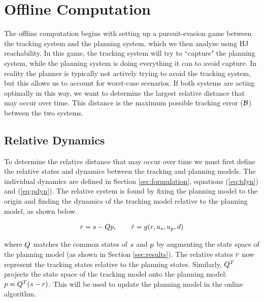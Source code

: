 \section{Offline Computation \label{sec:precomp}}
The offline computation begins with setting up a pursuit-evasion game \cite{Huang11, Chen17} between the tracking system and the planning system, which we then analyze using HJ reachability. In this game, the tracking system will try to ``capture" the planning system, while the planning system is doing everything it can to avoid capture. In reality the planner is typically not actively trying to avoid the tracking system, but this allows us to account for worst-case scenarios. If both systems are acting optimally in this way, we want to determine the largest relative distance that may occur over time. This distance is the maximum possible tracking error ($\mathcal B$) between the two systems.

\subsection{Relative Dynamics}
To determine the relative distance that may occur over time we must first define the relative states and dynamics between the tracking and planning models. The individual dynamics are defined in Section \ref{sec:formulation}, equations (\ref{eq:tdyn}) and (\ref{eq:pdyn}). The relative system is found by fixing the planning model to the origin and finding the dynamics of the tracking model relative to the planning model, as shown below.

\begin{equation}
\label{eq:rdyn}
\begin{aligned}
r = s - Qp, \qquad \dot{r} = g(r, u_s, u_p, d)
\end{aligned}
\end{equation}

\noindent where $Q$ matches the common states of $s$ and $p$ by augmenting the state space of the planning model (as shown in Section \ref{sec:results}). The relative states $r$ now represent the tracking states relative to the planning states. Similarly, $Q^T$ projects the state space of the tracking model onto the planning model: $p = Q^T(s-r)$. This will be used to update the planning model in the online algorithm.

